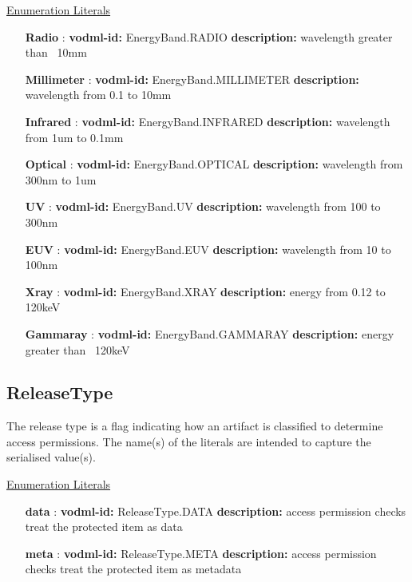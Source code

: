   \noindent \underline{Enumeration Literals}
  \vspace{-\parsep}
  \small
  \begin{itemize}
  
    \item[\textbf{Radio}]: \textbf{vodml-id:} EnergyBand.RADIO \newline
          \textbf{description:} wavelength greater than ~10mm
    \item[\textbf{Millimeter}]: \textbf{vodml-id:} EnergyBand.MILLIMETER \newline
          \textbf{description:} wavelength from 0.1 to 10mm
    \item[\textbf{Infrared}]: \textbf{vodml-id:} EnergyBand.INFRARED \newline
          \textbf{description:} wavelength from 1um to 0.1mm
    \item[\textbf{Optical}]: \textbf{vodml-id:} EnergyBand.OPTICAL \newline
          \textbf{description:} wavelength from 300nm to 1um
    \item[\textbf{UV}]: \textbf{vodml-id:} EnergyBand.UV \newline
          \textbf{description:} wavelength from 100 to 300nm
    \item[\textbf{EUV}]: \textbf{vodml-id:} EnergyBand.EUV \newline
          \textbf{description:} wavelength from 10 to 100nm
    \item[\textbf{Xray}]: \textbf{vodml-id:} EnergyBand.XRAY \newline
          \textbf{description:} energy from 0.12 to 120keV
    \item[\textbf{Gammaray}]: \textbf{vodml-id:} EnergyBand.GAMMARAY \newline
          \textbf{description:} energy greater than ~120keV
  \end{itemize}
  \normalsize


  \subsection{ReleaseType}
  \label{sect:ReleaseType}

  The release type is a flag indicating how an artifact is classified to determine access permissions. The name(s) of the literals are intended to capture the serialised value(s).

  \noindent \underline{Enumeration Literals}
  \vspace{-\parsep}
  \small
  \begin{itemize}
  
    \item[\textbf{data}]: \textbf{vodml-id:} ReleaseType.DATA \newline
          \textbf{description:} access permission checks treat the protected item as data
    \item[\textbf{meta}]: \textbf{vodml-id:} ReleaseType.META \newline
          \textbf{description:} access permission checks treat the protected item as metadata
  \end{itemize}
  \normalsize
